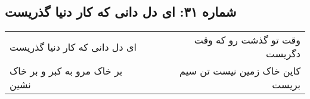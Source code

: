 \begin{center}
\section*{شماره ۳۱: ای دل دانی که کار دنیا گذریست}
\label{sec:031}
\begin{longtable}{l p{0.5cm} r}
ای دل دانی که کار دنیا گذریست
&&
وقت تو گذشت رو که وقت دگریست
\\
بر خاک مرو به کبر و بر خاک نشین
&&
کاین خاک زمین نیست تن سیم بریست
\\
\end{longtable}
\end{center}
